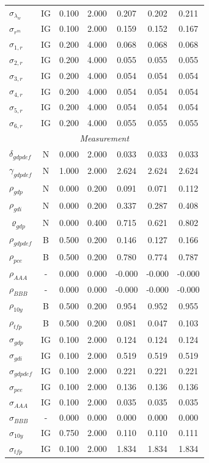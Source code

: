 \documentclass[12pt]{article}
\begin{document}
{\begin{longtable}{lcccccc}
$\sigma_{\lambda_w}$ & IG &    0.100 &    2.000 &    0.207 &    0.202 &    0.211 \\
$\sigma_{r^m}$ & IG &    0.100 &    2.000 &    0.159 &    0.152 &    0.167 \\
$\sigma_{1,r}$ & IG &    0.200 &    4.000 &    0.068 &    0.068 &    0.068 \\
$\sigma_{2,r}$ & IG &    0.200 &    4.000 &    0.055 &    0.055 &    0.055 \\
$\sigma_{3,r}$ & IG &    0.200 &    4.000 &    0.054 &    0.054 &    0.054 \\
$\sigma_{4,r}$ & IG &    0.200 &    4.000 &    0.054 &    0.054 &    0.054 \\
$\sigma_{5,r}$ & IG &    0.200 &    4.000 &    0.054 &    0.054 &    0.054 \\
$\sigma_{6,r}$ & IG &    0.200 &    4.000 &    0.055 &    0.055 &    0.055 \\
\multicolumn{7}{c}{\textit{Measurement}} \\[3pt]
$\delta_{gdpdef}$ & N &    0.000 &    2.000 &    0.033 &    0.033 &    0.033 \\
$\gamma_{gdpdef}$ & N &    1.000 &    2.000 &    2.624 &    2.624 &    2.624 \\
$\rho_{gdp}$ & N &    0.000 &    0.200 &    0.091 &    0.071 &    0.112 \\
$\rho_{gdi}$ & N &    0.000 &    0.200 &    0.337 &    0.287 &    0.408 \\
$\varrho_{gdp}$ & N &    0.000 &    0.400 &    0.715 &    0.621 &    0.802 \\
$\rho_{gdpdef}$ & B &    0.500 &    0.200 &    0.146 &    0.127 &    0.166 \\
$\rho_{pce}$ & B &    0.500 &    0.200 &    0.780 &    0.774 &    0.787 \\
$\rho_{AAA}$ & - &    0.000 &    0.000 &   -0.000 &   -0.000 &   -0.000 \\
$\rho_{BBB}$ & - &    0.000 &    0.000 &   -0.000 &   -0.000 &   -0.000 \\
$\rho_{10y}$ & B &    0.500 &    0.200 &    0.954 &    0.952 &    0.955 \\
$\rho_{tfp}$ & B &    0.500 &    0.200 &    0.081 &    0.047 &    0.103 \\
$\sigma_{gdp}$ & IG &    0.100 &    2.000 &    0.124 &    0.124 &    0.124 \\
$\sigma_{gdi}$ & IG &    0.100 &    2.000 &    0.519 &    0.519 &    0.519 \\
$\sigma_{gdpdef}$ & IG &    0.100 &    2.000 &    0.221 &    0.221 &    0.221 \\
$\sigma_{pce}$ & IG &    0.100 &    2.000 &    0.136 &    0.136 &    0.136 \\
$\sigma_{AAA}$ & IG &    0.100 &    2.000 &    0.035 &    0.035 &    0.035 \\
$\sigma_{BBB}$ & - &    0.000 &    0.000 &    0.000 &    0.000 &    0.000 \\
$\sigma_{10y}$ & IG &    0.750 &    2.000 &    0.110 &    0.110 &    0.111 \\
$\sigma_{tfp}$ & IG &    0.100 &    2.000 &    1.834 &    1.834 &    1.834 \\
\end{longtable}}
\end{document}
